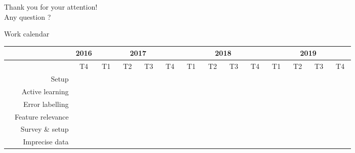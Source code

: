 \documentclass{beamer}
\begin{document}
\begin{frame}
\begin{center}
	Thank you for your attention! \\ 
	Any question ? 
\end{center}
\end{frame}

\begin{frame}{Work calendar}
	\footnotesize
	\begin{table}
	\hspace*{-0.5cm}
	\setlength\tabcolsep{3pt} %
	\begin{tabular}{|c|r|ccc|cccccccccccc|cccccccccccc|cccccccccccc|}
		\hline
		& & \multicolumn{3}{c|}{2016} & \multicolumn{12}{c|}{2017} & \multicolumn{12}{c|}{2018}  & \multicolumn{12}{c|}{2019}  \\
		\hline	
		& & \multicolumn{3}{c|}{T4} & \multicolumn{3}{c|}{T1} & \multicolumn{3}{c|}{T2} & \multicolumn{3}{c|}{T3} & \multicolumn{3}{c|}{T4} & \multicolumn{3}{c|}{T1} & \multicolumn{3}{c|}{T2} & \multicolumn{3}{c|}{T3} & \multicolumn{3}{c|}{T4}  & \multicolumn{3}{c|}{T1} & \multicolumn{3}{c|}{T2} & \multicolumn{3}{c|}{T3} & \multicolumn{3}{c|}{T4}\\ 
		\hline
		& Setup & \cellcolor{black} & \cellcolor{black} & \cellcolor{black} & \cellcolor{black} & \cellcolor{black} & & & & & & & & & & & & & & & & & & & & & & & & & & & & & & & & & & \\
		\hdashline
		 \parbox[t]{2mm}{} & Active learning & & & & & &  &  &  &  & & & & & & & & & & & & & & & & & & & & & & & & & & & & & &\\
		& Error labelling & & & & & & & & & &  &  &  &  &  &  & & & & & & & & & & & & & & & & & & & & & & & & \\
		& Feature relevance & & & & & & & & & & & & & & & &  &  &  &  &  &  & & & & & & & & & & & & & & & & & & \\
		\hdashline
		 \parbox[t]{2mm}{} & Survey \& setup & & & & & & & & & & & & & & & & & & & & & &  & & & & & & & & & & & & & & & & & \\
		& Imprecise data & & & & & & & & & & & & & & & & & & & & & & &  &  &  &  &  &  &  & & & & & & & & & & \\

\end{tabular}
\end{table}
\end{frame}
\end{document}
